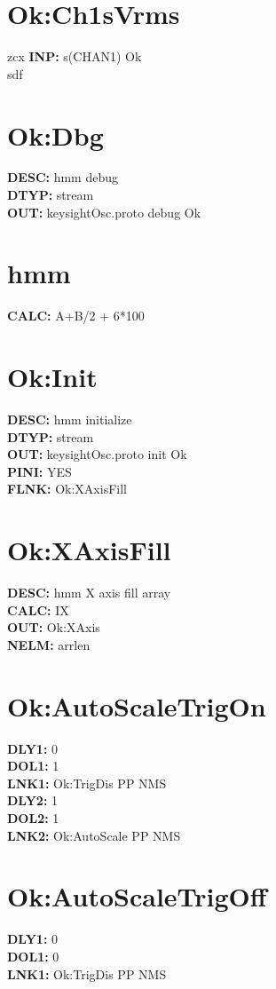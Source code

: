 \documentclass[12pt]{article}
\begin{document}
\section{Ok:Ch1sVrms}
{zcx}
\textbf{INP: }s(CHAN1) Ok \\
sdf \\
\newpage
\section{Ok:Dbg}
\textbf{DESC: }hmm debug \\
\textbf{DTYP: }stream \\
\textbf{OUT: }keysightOsc.proto debug Ok \\
\newpage
\section{hmm}
\textbf{CALC: }A+B/2 + 6*100 \\
\newpage
\section{Ok:Init}
\textbf{DESC: }hmm initialize \\
\textbf{DTYP: }stream \\
\textbf{OUT: }keysightOsc.proto init Ok \\
\textbf{PINI: }YES \\
\textbf{FLNK: }Ok:XAxisFill \\
\newpage
\section{Ok:XAxisFill}
\textbf{DESC: }hmm X axis fill array \\
\textbf{CALC: }IX \\
\textbf{OUT: }Ok:XAxis \\
\textbf{NELM: }arrlen \\
\newpage
\section{Ok:AutoScaleTrigOn}
\textbf{DLY1: }0 \\
\textbf{DOL1: }1 \\
\textbf{LNK1: }Ok:TrigDis PP NMS \\
\textbf{DLY2: }1 \\
\textbf{DOL2: }1 \\
\textbf{LNK2: }Ok:AutoScale PP NMS \\
\newpage
\section{Ok:AutoScaleTrigOff}
\textbf{DLY1: }0 \\
\textbf{DOL1: }0 \\
\textbf{LNK1: }Ok:TrigDis PP NMS \\
\newpage
\end{document}

